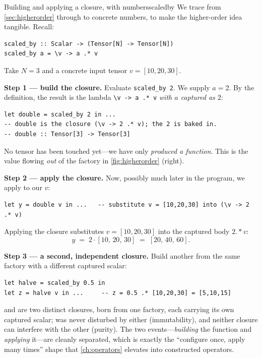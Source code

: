 \begin{workedexample}{Building and applying a closure, with numbers}{scaledby}
We trace  from \cref{sec:higherorder} through to concrete
numbers, to make the higher-order idea tangible. Recall:
\begin{lstlisting}[style=l4style]
scaled_by :: Scalar -> (Tensor[N] -> Tensor[N])
scaled_by a = \v -> a .* v
\end{lstlisting}
Take $N = 3$ and a concrete input tensor $v = [10, 20, 30]$.

\textbf{Step 1 --- build the closure.} Evaluate \lstinline[style=l4style]|scaled_by 2|.
We supply $a = 2$. By the definition, the result is the lambda
\lstinline[style=l4style]|\v -> a .* v| \emph{with $a$ captured as $2$}:
\begin{lstlisting}[style=l4style]
let double = scaled_by 2 in ...
-- double is the closure (\v -> 2 .* v); the 2 is baked in.
-- double :: Tensor[3] -> Tensor[3]
\end{lstlisting}
No tensor has been touched yet---we have only \emph{produced a function}. This is
the value flowing \emph{out} of the factory in \cref{fig:higherorder} (right).

\textbf{Step 2 --- apply the closure.} Now, possibly much later in the program,
we apply  to our $v$:
\begin{lstlisting}[style=l4style]
let y = double v in ...   -- substitute v = [10,20,30] into (\v -> 2 .* v)
\end{lstlisting}
Applying the closure substitutes $v = [10,20,30]$ into the captured body
$2 .* v$:
\[
  y \;=\; 2 \cdot [10,\,20,\,30] \;=\; [20,\,40,\,60].
\]

\textbf{Step 3 --- a second, independent closure.} Build another from the same
factory with a different captured scalar:
\begin{lstlisting}[style=l4style]
let halve = scaled_by 0.5 in
let z = halve v in ...     -- z = 0.5 .* [10,20,30] = [5,10,15]
\end{lstlisting}
 and  are two distinct closures, born from one factory,
each carrying its own captured scalar;  was never disturbed by either
(immutability), and neither closure can interfere with the other (purity). The
two events---\emph{building} the function and \emph{applying} it---are cleanly
separated, which is exactly the ``configure once, apply many times'' shape that
\cref{ch:operators} elevates into constructed operators.
\end{workedexample}


